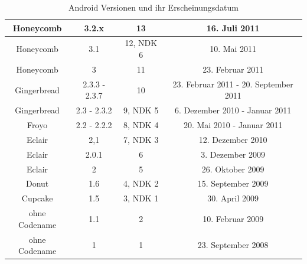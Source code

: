 \begin{table}[htbp]
{\begin{tabular}{|c|c|c|c|}
			Honeycomb                                & 3.2.x                                   & 13                                        & 16. Juli 2011                                     \\ \hline
			Honeycomb                                & 3.1                                     & 12, NDK 6                                 & 10. Mai 2011                                      \\ \hline
			Honeycomb                                & 3                                       & 11                                        & 23. Februar 2011                                  \\ \hline
			Gingerbread                              & 2.3.3 - 2.3.7                           & 10                                        & 23. Februar 2011 - 20. September 2011             \\ \hline
			Gingerbread                              & 2.3 - 2.3.2                             & 9, NDK 5                                  & 6. Dezember 2010 - Januar 2011                    \\ \hline
			Froyo                                    & 2.2 - 2.2.2                             & 8, NDK 4                                  & 20. Mai 2010 - Januar 2011                        \\ \hline
			Eclair                                   & 2,1                                     & 7, NDK 3                                  & 12. Dezember 2010                                 \\ \hline
			Eclair                                   & 2.0.1                                   & 6                                         & 3. Dezember 2009                                  \\ \hline
			Eclair                                   & 2                                       & 5                                         & 26. Oktober 2009                                  \\ \hline
			Donut                                    & 1.6                                     & 4, NDK 2                                  & 15. September 2009                                \\ \hline
			Cupcake                                  & 1.5                                     & 3, NDK 1                                  & 30. April 2009                                    \\ \hline
			ohne Codename                            & 1.1                                     & 2                                         & 10. Februar 2009                                  \\ \hline
			ohne Codename                            & 1                                       & 1                                         & 23. September 2008                                \\ \hline
		\end{tabular}
	}
	\caption{Android Versionen und ihr Erscheinungsdatum}\label{tab_android_vers}\citep{android_codenames,android_version_releases}
\end{table}

